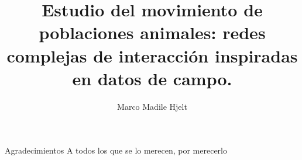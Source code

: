 \documentclass[12pt,screen,twoside,pagebackref]{ibtesis}
\title{Estudio del movimiento de poblaciones animales: redes complejas de interacción inspiradas en datos de campo.}
\author{Marco Madile Hjelt}
\begin{document}

\begin{preliminary}




\tableofcontents                %

\listoffigures                  %

\listoftables                   %



\end{preliminary}







\appendix


\begin{biblio}

\end{biblio}


\begin{postliminary}


\begin{seccion}{Agradecimientos}
A todos los que se lo merecen, por merecerlo
\end{seccion}

\end{postliminary}
\end{document}
